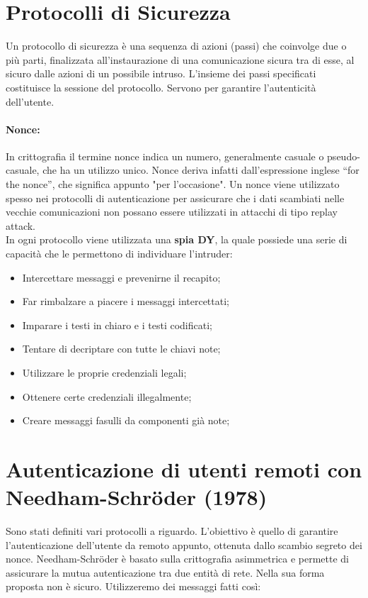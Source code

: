 \section{Protocolli di Sicurezza}

Un protocollo di sicurezza è una sequenza di azioni (passi) che
coinvolge due o più parti,
finalizzata all'instaurazione di una comunicazione sicura tra di esse,
al sicuro dalle azioni di un
possibile intruso. L'insieme dei passi specificati costituisce la sessione
del protocollo.
Servono per garantire l'autenticità dell'utente.

\paragraph{Nonce: }
In crittografia il termine nonce indica un numero, generalmente casuale
o pseudo-casuale,
che ha un utilizzo unico. Nonce deriva infatti dall'espressione inglese
“for the nonce”, che significa
appunto "per l'occasione". Un nonce viene utilizzato spesso nei protocolli
di autenticazione per
assicurare che i dati scambiati nelle vecchie comunicazioni non possano
essere utilizzati in
attacchi di tipo replay attack.\\

In ogni protocollo viene utilizzata una \textbf{spia DY}, la quale possiede una serie di capacità che le
permettono di individuare l'intruder:
\begin{itemize}
    \item Intercettare messaggi e prevenirne il recapito;
    \item Far rimbalzare a piacere i messaggi intercettati;
    \item Imparare i testi in chiaro e i testi codificati;
    \item Tentare di decriptare con tutte le chiavi note;
    \item Utilizzare le proprie credenziali legali;
    \item Ottenere certe credenziali illegalmente;
    \item Creare messaggi fasulli da componenti già note;
\end{itemize}

\section{Autenticazione di utenti remoti con Needham-Schr\"{o}der (1978)}

Sono stati definiti vari protocolli a riguardo. L'obiettivo è quello di
garantire l'autenticazione
dell'utente da remoto appunto, ottenuta dallo scambio segreto dei nonce.
Needham-Schröder è basato sulla crittografia asimmetrica e permette
di assicurare la mutua
autenticazione tra due entità di rete. Nella sua forma proposta
non è sicuro.
Utilizzeremo dei messaggi fatti così:

